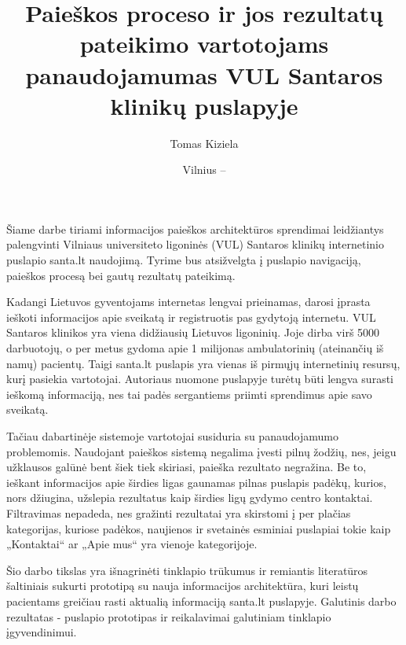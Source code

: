 \documentclass{VUMIFPSkursinis}
\title{Paieškos proceso ir jos rezultatų pateikimo vartotojams panaudojamumas VUL Santaros klinikų puslapyje}
\author{Tomas Kiziela}
\date{Vilnius – \the\year}
\begin{document}
	
\maketitle
\cleardoublepage{}
\setcounter{page}{2}

\tableofcontents

Šiame darbe tiriami informacijos paieškos architektūros sprendimai leidžiantys palengvinti Vilniaus universiteto ligoninės (VUL) Santaros klinikų internetinio puslapio santa.lt naudojimą. Tyrime bus atsižvelgta į puslapio navigaciją, paieškos procesą bei gautų rezultatų pateikimą.

Kadangi Lietuvos gyventojams internetas lengvai prieinamas, darosi įprasta ieškoti informacijos apie sveikatą ir registruotis pas gydytoją internetu\cite{InternetUseByPublicSAEn}\cite{InternetUseByPublicHKEn}. VUL Santaros klinikos yra viena didžiausių Lietuvos ligoninių. Joje dirba virš 5000 darbuotojų, o per metus gydoma apie 1 milijonas ambulatorinių (ateinančių iš namų) pacientų\cite{VulSkApieMusLt}. Taigi santa.lt puslapis yra vienas iš pirmųjų internetinių resursų, kurį pasiekia vartotojai. Autoriaus nuomone puslapyje turėtų būti lengva surasti ieškomą informaciją, nes tai padės sergantiems priimti sprendimus apie savo sveikatą.

Tačiau dabartinėje sistemoje vartotojai susiduria su panaudojamumo problemomis. Naudojant paieškos sistemą negalima įvesti pilnų žodžių, nes, jeigu užklausos galūnė bent šiek tiek skiriasi, paieška rezultato negražina. Be to, ieškant informacijos apie širdies ligas gaunamas pilnas puslapis padėkų, kurios, nors džiugina, užslepia rezultatus kaip širdies ligų gydymo centro kontaktai. Filtravimas nepadeda, nes gražinti rezultatai yra skirstomi į per plačias kategorijas, kuriose padėkos, naujienos ir svetainės esminiai puslapiai tokie kaip „Kontaktai“ ar „Apie mus“ yra vienoje kategorijoje. 

Šio darbo tikslas yra išnagrinėti tinklapio trūkumus ir remiantis literatūros šaltiniais sukurti prototipą su nauja informacijos architektūra, kuri leistų pacientams greičiau rasti aktualią informaciją santa.lt puslapyje. Galutinis darbo rezultatas - puslapio prototipas ir reikalavimai galutiniam tinklapio įgyvendinimui.
\end{document}
